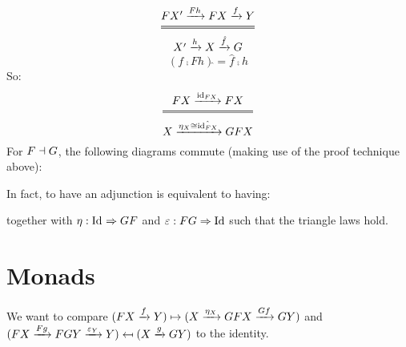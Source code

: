 \begin{example}
$ $ \newline
\begin{center}
\end{center}

\[\Efrac{FX' \xto{Fh} FX \xto{f} Y}{X' \xto{h} X \xto{\hat{f}} G}\]
\[(f \comp Fh)\hat{} = \hat{f} \comp h\]
So:
\[\Efrac{FX \xto{\id{FX}} FX}{X \xto{\eta_X \iso \hat{\id{FX}}} GFX}\]

\begin{definition}
For $F \dashv G$, the following diagrams commute (making use of the proof technique above):

\begin{center}
\end{center}

In fact, to have an adjunction is equivalent to having:
\begin{center}
\end{center}
together with $\eta: \mathrm{Id}_{  } \Rightarrow GF$ and $\varepsilon: FG \Rightarrow \mathrm{Id}_{  }$ such that the triangle laws hold.
\end{definition}
\end{example}

\section{Monads}
We want to compare $(FX \xrightarrow{f} Y) \mapsto (X \xrightarrow{\eta_X} GFX \xrightarrow{Gf} GY)$ and $(FX \xto{Fg} FGY \xto{\varepsilon_Y} Y) \mapsfrom (X \xto{g} GY)$ to the identity.

